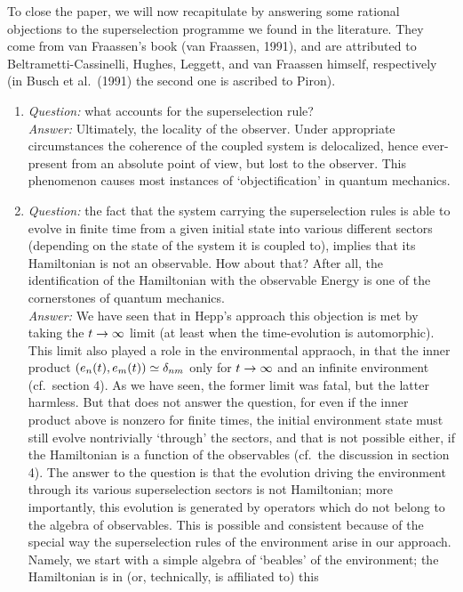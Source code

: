  To close the paper, we will now recapitulate by answering some rational
objections to the
superselection programme we found in the literature. They come from van
Fraassen's
book (van Fraassen, 1991), and are attributed to Beltrametti-Cassinelli,
Hughes, Leggett, and van
Fraassen himself, respectively (in  Busch et al.\ (1991) the second one is
ascribed to Piron).
\begin{enumerate}
\item {\em Question:} what accounts for the superselection rule?\\ {\em
Answer:} Ultimately, the
locality of the observer. Under appropriate circumstances the coherence of the
coupled system is
delocalized, hence ever-present from an absolute point of view, but lost to the
observer.
This phenomenon causes most instances of `objectification' in quantum
mechanics.
 \item {\em
Question:} the fact that the system carrying the superselection rules is able
to evolve in finite
time from a given initial state into various different sectors (depending on
the state of the system
it is coupled to), implies that its Hamiltonian is not an observable. How about
that? After all, the
identification of the Hamiltonian  with the observable Energy is one of the
cornerstones of quantum
mechanics.\\
 {\em Answer:} We have seen that in Hepp's approach this objection is met by
taking the
$t\rightarrow\infty$ limit (at least when the time-evolution is automorphic).  This
limit also played a role
in the environmental appraoch, in that the inner product $(e_n(t),e_m(t))\simeq
\delta_{nm}$ only for
$t\rightarrow \infty$ and an infinite environment (cf.\ section 4). As we have seen,
the former limit was
fatal, but the latter harmless. But that does not answer the question, for even
if the inner product
above is nonzero for finite times, the initial environment state  must still
evolve nontrivially
`through' the sectors, and that is not possible either, if the Hamiltonian is a
function of the
observables (cf.\ the discussion in section 4). The answer to the question is
that the
evolution driving the environment through its various superselection sectors is
  not  Hamiltonian;
more importantly, this evolution is generated by operators which do not belong
to the algebra of
observables.
 This is possible and consistent because of the special way the superselection
rules of
the environment arise in our approach. Namely, we start with a simple algebra
of `beables' of the
environment; the Hamiltonian is in (or, technically, is affiliated to) this

\end{enumerate}
